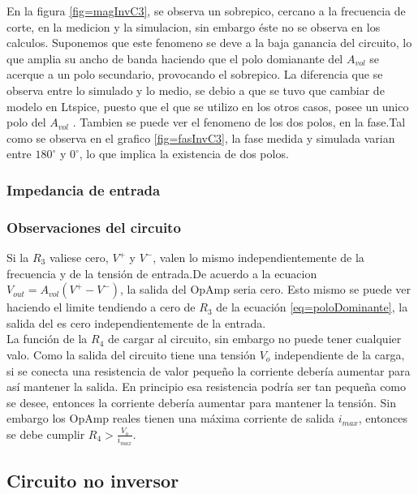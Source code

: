 \documentclass[../../main.tex]{subfiles}
\begin{document}
En la figura \ref{fig=magInvC3}, se observa un sobrepico, cercano a la frecuencia de corte, en la medicion y la simulacion, sin embargo éste no se observa en los calculos. Suponemos que este fenomeno se deve a la baja ganancia del circuito, lo que amplia su ancho de banda haciendo que el polo domianante del  
$A_{vol}$ se acerque a un polo secundario, provocando el sobrepico.
La diferencia que se observa entre lo simulado y lo medio, se debio a que se tuvo que cambiar de modelo en Ltspice, puesto que el que se utilizo en los otros casos, posee un unico polo del $A_{vol}$ .
Tambien se puede ver el fenomeno de los dos polos, en la fase.Tal como se observa en el grafico \ref{fig=fasInvC3}, la fase medida y simulada varian entre  $180^{\circ}$ y $0^{\circ}$, lo que implica la existencia de dos polos.

\subsubsection{Impedancia de entrada}



\subsubsection{Observaciones del circuito}
Si la $R_{3}$ valiese cero, $V^{+}$ y $V^{-}$, valen lo mismo independientemente de la frecuencia y de la tensión de entrada.De acuerdo a la ecuacion $V_{out}=A_{vol}(V^{+}-V^{-})$, la salida del OpAmp seria cero. Esto mismo se puede ver haciendo el limite tendiendo a cero de $R_{3}$ de la ecuación \ref{eq=poloDominante}, la salida del es cero independientemente de la entrada.
\\
La función de la $R_{4}$ de cargar al circuito, sin embargo no puede tener cualquier valo. Como la salida del circuito tiene una tensión $V_{o}$ independiente de la carga, si se conecta una resistencia de valor pequeño la corriente debería aumentar para así mantener la salida. En principio esa resistencia podría ser tan pequeña como se desee, entonces la corriente debería aumentar para mantener la tensión. Sin embargo los OpAmp reales tienen una máxima corriente de salida $i_{max}$, entonces se debe cumplir $R_{4}> \frac {V_{o}}{ i_{max}}$.




\subsection{Circuito no inversor}
\end{document}
